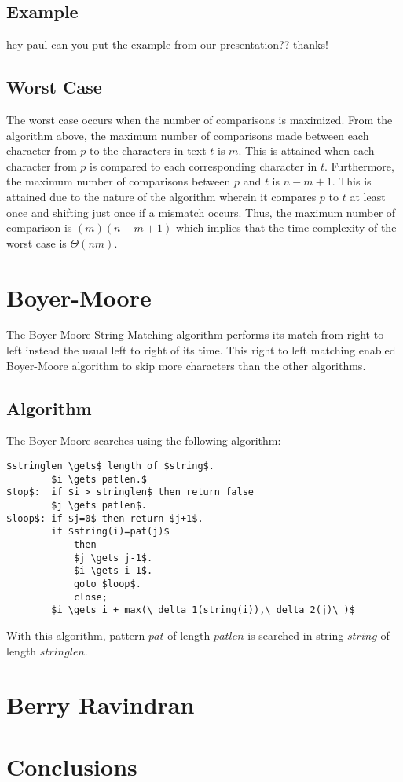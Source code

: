 \subsection{Example}
hey paul can you put the example from our presentation?? thanks!
\subsection{Worst Case}    
The worst case occurs when the number of comparisons is maximized. From the algorithm above, the maximum number of comparisons made between each character from $p$ to the characters in text $t$ is $m$. This is attained when each character from $p$ is compared to each corresponding character in $t$. Furthermore, the maximum number of comparisons between $p$ and $t$ is $n-m+1$. This is attained due to the nature of the algorithm wherein it compares $p$ to $t$ at least once and shifting just once if a mismatch occurs. Thus, the maximum number of comparison is $(m)(n-m+1)$ which implies that the time complexity of the worst case is $\Theta(nm)$.
\section{Boyer-Moore}
The Boyer-Moore String Matching algorithm performs its match from right to left instead the usual left to right of its time. This right to left matching enabled Boyer-Moore algorithm to skip more characters than the other algorithms.

\subsection{Algorithm}
The Boyer-Moore searches using the following algorithm:
\begin{lstlisting}[mathescape=true]
		$stringlen \gets$ length of $string$.
		$i \gets patlen.$
$top$:	if $i > stringlen$ then return false
		$j \gets patlen$.
$loop$:	if $j=0$ then return $j+1$.
		if $string(i)=pat(j)$
			then
			$j \gets j-1$.
			$i \gets i-1$.
			goto $loop$.
			close;
		$i \gets i + max(\ delta_1(string(i)),\ delta_2(j)\ )$
\end{lstlisting}

With this algorithm, pattern $pat$ of length $patlen$ is searched in string $string$ of length $stringlen$.

\section{Berry Ravindran}

\section{Conclusions}

